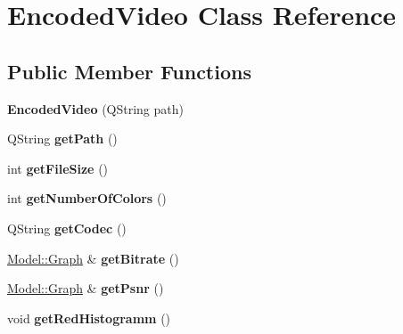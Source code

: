 \hypertarget{classModel_1_1EncodedVideo}{}\section{Encoded\+Video Class Reference}
\label{classModel_1_1EncodedVideo}
\subsection*{Public Member Functions}
\begin{DoxyCompactItemize}
\item 
\hypertarget{classModel_1_1EncodedVideo_a436d811c3c2420e132a2b4e04959c5de}{}{\bfseries Encoded\+Video} (Q\+String path)\label{classModel_1_1EncodedVideo_a436d811c3c2420e132a2b4e04959c5de}

\item 
\hypertarget{classModel_1_1EncodedVideo_a1a94d0c9bf9dd725556721ac914025e3}{}Q\+String {\bfseries get\+Path} ()\label{classModel_1_1EncodedVideo_a1a94d0c9bf9dd725556721ac914025e3}

\item 
\hypertarget{classModel_1_1EncodedVideo_ac4465cfb146410e557acc4892afd9e7c}{}int {\bfseries get\+File\+Size} ()\label{classModel_1_1EncodedVideo_ac4465cfb146410e557acc4892afd9e7c}

\item 
\hypertarget{classModel_1_1EncodedVideo_ab9202ba7e871cc8488f73a14e4e6abef}{}int {\bfseries get\+Number\+Of\+Colors} ()\label{classModel_1_1EncodedVideo_ab9202ba7e871cc8488f73a14e4e6abef}

\item 
\hypertarget{classModel_1_1EncodedVideo_ad0b9ca84489c31d0155646495380ac0b}{}Q\+String {\bfseries get\+Codec} ()\label{classModel_1_1EncodedVideo_ad0b9ca84489c31d0155646495380ac0b}

\item 
\hypertarget{classModel_1_1EncodedVideo_afe6efbe8e2d7312d31f9df848685c2a1}{}\hyperlink{classModel_1_1Graph}{Model\+::\+Graph} \& {\bfseries get\+Bitrate} ()\label{classModel_1_1EncodedVideo_afe6efbe8e2d7312d31f9df848685c2a1}

\item 
\hypertarget{classModel_1_1EncodedVideo_a4c4816fa0fc4d120b7ca4727f92b8434}{}\hyperlink{classModel_1_1Graph}{Model\+::\+Graph} \& {\bfseries get\+Psnr} ()\label{classModel_1_1EncodedVideo_a4c4816fa0fc4d120b7ca4727f92b8434}

\item 
\hypertarget{classModel_1_1EncodedVideo_a8323d9d826f26ba8b5955b9059df46ff}{}void {\bfseries get\+Red\+Histogramm} ()\label{classModel_1_1EncodedVideo_a8323d9d826f26ba8b5955b9059df46ff}


\end{DoxyCompactItemize}
